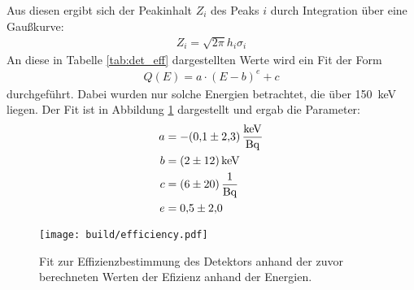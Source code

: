 Aus diesen ergibt sich der Peakinhalt $Z_i$ des Peaks $i$ durch Integration
über eine Gaußkurve:
\begin{align*}
  Z_i = \sqrt{2\pi} h_i \sigma_i
\end{align*}
An diese in Tabelle \ref{tab:det_eff} dargestellten Werte wird ein Fit der Form
\begin{align*}
  Q(E) = a \cdot (E - b)^e + c
\end{align*}
durchgeführt. Dabei wurden nur solche Energien betrachtet, die über
\SI{150}{\kilo\electronvolt} liegen.
Der Fit ist in Abbildung \ref{plt:eff} dargestellt und ergab die Parameter:
\begin{align*}
  a &= -\SI{0.1(23)}{\kilo\electronvolt\per\becquerel} \\
  b &= \SI{2(12)}{\kilo\electronvolt} \\
  c &= \SI{6(20)}{\raiseto{-1}\becquerel} \\
  e &= \num{0.5(20)}
\end{align*}
\begin{figure}[htb]
  \centering
  \texttt{[image: build/efficiency.pdf]}
  \caption{Fit zur Effizienzbestimmung des Detektors anhand der zuvor
  berechneten Werten der Efizienz anhand der Energien.}
  \label{plt:eff}
\end{figure}


\FloatBarrier


